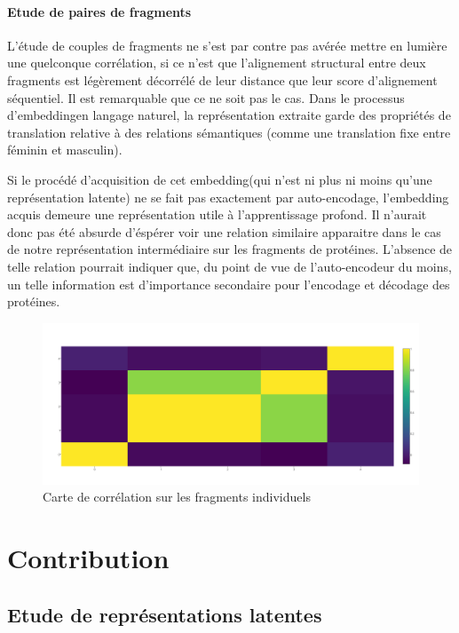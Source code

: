 \documentclass[a4paper, 11pt, onecolumn]{article}
\begin{document}
\paragraph{Etude de paires de fragments}

L'étude de couples de fragments ne s'est par contre pas avérée mettre en lumière
une quelconque corrélation, si ce n'est que l'alignement structural entre deux
fragments est légèrement décorrélé de leur distance que leur score d'alignement
séquentiel. Il est remarquable que ce ne soit pas le cas. Dans le processus \og
d'embedding\fg en langage naturel, la représentation extraite garde des
propriétés de translation relative à des relations sémantiques (comme une
translation fixe entre féminin et masculin). 

Si le procédé d'acquisition de cet
\og embedding\fg (qui n'est ni plus ni moins qu'une représentation latente) ne
se fait pas exactement par auto-encodage, l'embedding acquis demeure une
représentation utile à l'apprentissage profond.  Il n'aurait donc pas été
absurde d'éspérer voir une relation similaire apparaitre dans le cas de notre
représentation intermédiaire sur les fragments de protéines. L'absence de telle
relation pourrait indiquer que, du point de vue de l'auto-encodeur du moins, un
telle information est d'importance secondaire pour l'encodage et décodage des protéines.

\begin{figure}
  \centering
  \includegraphics[scale=0.3]{PairOneRecHeat}
  \caption{Carte de corrélation sur les fragments individuels}
\end{figure}

\section{Contribution}

\subsection{Etude de représentations latentes}
\end{document}
